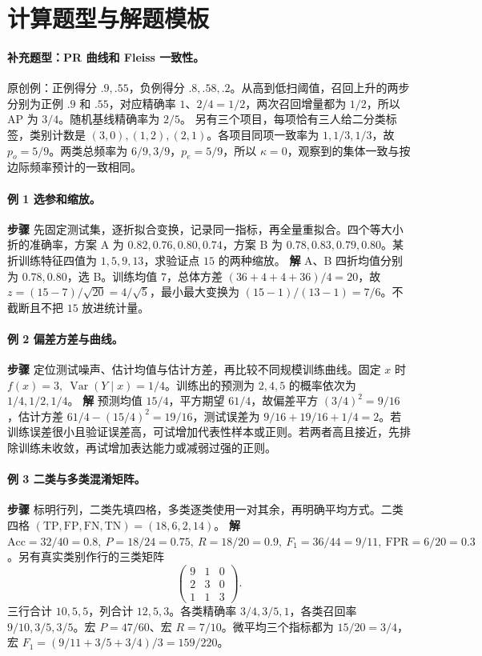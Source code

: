 \documentclass[UTF8,a4paper,zihao=-4,fontset=fandol]{ctexrep}
\begin{document}
\section{计算题型与解题模板}

\paragraph{补充题型：PR 曲线和 Fleiss 一致性。}
原创例：正例得分 $.9,.55$，负例得分 $.8,.58,.2$。从高到低扫阈值，召回上升的两步分别为正例 $.9$ 和 $.55$，对应精确率 $1$、$2/4=1/2$，两次召回增量都为 $1/2$，所以 AP 为 $3/4$。随机基线精确率为 $2/5$。
另有三个项目，每项恰有三人给二分类标签，类别计数是 $(3,0),(1,2),(2,1)$。各项目同项一致率为 $1,1/3,1/3$，故 $p_o=5/9$。两类总频率为 $6/9,3/9$，$p_e=5/9$，所以 $\kappa=0$，观察到的集体一致与按边际频率预计的一致相同。
\paragraph{例 1 选参和缩放。}
\textbf{步骤} 先固定测试集，逐折拟合变换，记录同一指标，再全量重拟合。四个等大小折的准确率，方案 A 为 \(0.82,0.76,0.80,0.74\)，方案 B 为 \(0.78,0.83,0.79,0.80\)。某折训练特征四值为 \(1,5,9,13\)，求验证点 \(15\) 的两种缩放。
\textbf{解} A、B 四折均值分别为 \(0.78,0.80\)，选 B。训练均值 \(7\)，总体方差 \((36+4+4+36)/4=20\)，故 \(z=(15-7)/\sqrt{20}=4/\sqrt5\)，最小最大变换为 \((15-1)/(13-1)=7/6\)。不截断且不把 \(15\) 放进统计量。

\paragraph{例 2 偏差方差与曲线。}
\textbf{步骤} 定位测试噪声、估计均值与估计方差，再比较不同规模训练曲线。固定 \(x\) 时 \(f(x)=3,\ \operatorname{Var}(Y\mid x)=1/4\)。训练出的预测为 \(2,4,5\) 的概率依次为 \(1/4,1/2,1/4\)。
\textbf{解} 预测均值 \(15/4\)，平方期望 \(61/4\)，故偏差平方 \((3/4)^2=9/16\)，估计方差 \(61/4-(15/4)^2=19/16\)，测试误差为 \(9/16+19/16+1/4=2\)。若训练误差很小且验证误差高，可试增加代表性样本或正则。若两者高且接近，先排除训练未收敛，再试增加表达能力或减弱过强的正则。

\paragraph{例 3 二类与多类混淆矩阵。}
\textbf{步骤} 标明行列，二类先填四格，多类逐类使用一对其余，再明确平均方式。二类四格 \((\mathrm{TP},\mathrm{FP},\mathrm{FN},\mathrm{TN})=(18,6,2,14)\)。
\textbf{解} \(\mathrm{Acc}=32/40=0.8,\ P=18/24=0.75,\ R=18/20=0.9,\ F_1=36/44=9/11,\ \mathrm{FPR}=6/20=0.3\)。另有真实类别作行的三类矩阵
\[
 \begin{pmatrix}9&1&0\\2&3&0\\1&1&3\end{pmatrix}.
\]
三行合计 \(10,5,5\)，列合计 \(12,5,3\)。各类精确率 \(3/4,3/5,1\)，各类召回率 \(9/10,3/5,3/5\)。宏 \(P=47/60\)、宏 \(R=7/10\)。微平均三个指标都为 \(15/20=3/4\)，宏 \(F_1=(9/11+3/5+3/4)/3=159/220\)。
\end{document}
